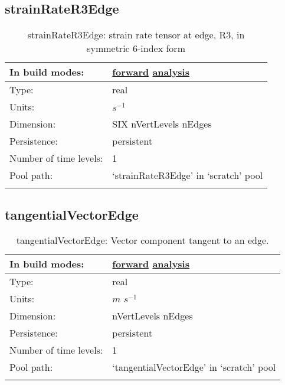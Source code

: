 \subsection[strainRateR3Edge]{strainRateR3Edge}
\label{subsec:var_sec_scratch_strainRateR3Edge}
\begin{center}
\begin{longtable}{| p{2.0in} | p{4.0in} |}
        \hline 
        In build modes: & \hyperref[subsec:forward_var_tab_scratch]{forward} \hyperref[subsec:analysis_var_tab_scratch]{analysis} \\
        \hline 
        Type: & real \\
        \hline 
        Units: & $s^{-1}$ \\
        \hline 
        Dimension: & SIX nVertLevels nEdges \\
        \hline 
        Persistence: & persistent \\
        \hline 
        Number of time levels: & 1 \\
        \hline 
            Pool path: & `strainRateR3Edge' in `scratch' pool \\
		 \hline 
    \caption{strainRateR3Edge: strain rate tensor at edge, R3, in symmetric 6-index form}
\end{longtable}
\end{center}
\subsection[tangentialVectorEdge]{tangentialVectorEdge}
\label{subsec:var_sec_scratch_tangentialVectorEdge}
\begin{center}
\begin{longtable}{| p{2.0in} | p{4.0in} |}
        \hline 
        In build modes: & \hyperref[subsec:forward_var_tab_scratch]{forward} \hyperref[subsec:analysis_var_tab_scratch]{analysis} \\
        \hline 
        Type: & real \\
        \hline 
        Units: & $m$ $s^{-1}$ \\
        \hline 
        Dimension: & nVertLevels nEdges \\
        \hline 
        Persistence: & persistent \\
        \hline 
        Number of time levels: & 1 \\
        \hline 
            Pool path: & `tangentialVectorEdge' in `scratch' pool \\
		 \hline 
    \caption{tangentialVectorEdge: Vector component tangent to an edge.}
\end{longtable}
\end{center}
